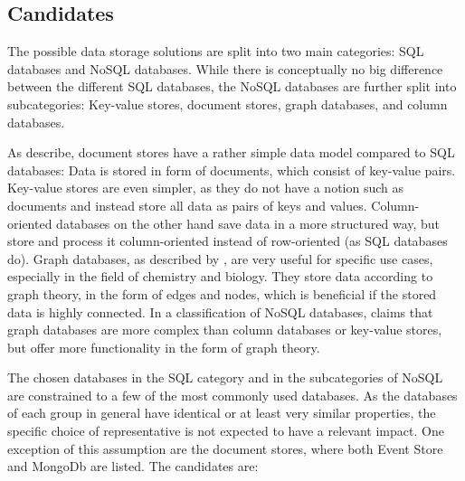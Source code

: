 
\subsection{Candidates}

The possible data storage solutions are split into two main categories: \ac{SQL} databases and \ac{NoSQL} databases.
While there is conceptually no big difference between the different \ac{SQL} databases, the \ac{NoSQL} databases are further split into subcategories: Key-value stores, document stores, graph databases, and column databases.

As \citet{strauch2011nosql} describe, document stores have a rather simple data model compared to \ac{SQL} databases:
Data is stored in form of documents, which consist of key-value pairs.
Key-value stores are even simpler, as they do not have a notion such as documents and instead store all data as pairs of keys and values.
Column-oriented databases on the other hand save data in a more structured way, but store and process it column-oriented instead of row-oriented (as \ac{SQL} databases do).
Graph databases, as described by \citet{miller2013graph}, are very useful for specific use cases, especially in the field of chemistry and biology.
They store data according to graph theory, in the form of edges and nodes, which is beneficial if the stored data is highly connected.
In a classification of \ac{NoSQL} databases, \citet{popescu2010nosql} claims that graph databases are more complex than column databases or key-value stores, but offer more functionality in the form of graph theory.

The chosen databases in the \ac{SQL} category and in the subcategories of \ac{NoSQL} are constrained to a few of the most commonly used databases.
As the databases of each group in general have identical or at least very similar properties, the specific choice of representative is not expected to have a relevant impact.
One exception of this assumption are the document stores, where both Event Store and MongoDb are listed.
The candidates are:

